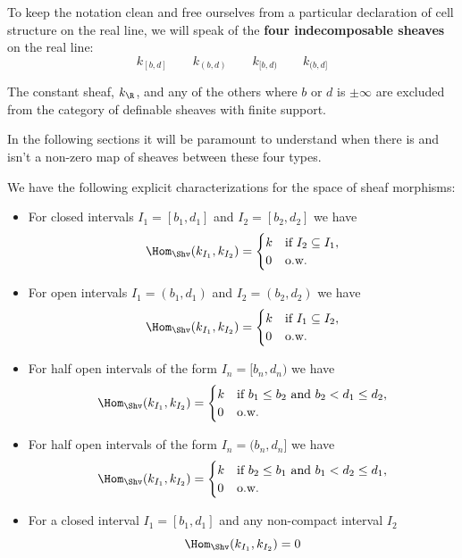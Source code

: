 To keep the notation clean and free ourselves from a particular declaration of cell structure on the real line, we will speak of the \textbf{four indecomposable sheaves} on the real line:
\[
k_{[b,d]} \qquad k_{(b,d)} \qquad k_{[b,d)} \qquad k_{(b,d]}
\]

\begin{rmk}
The constant sheaf, $k_{\R}$, and any of the others where $b$ or $d$ is $\pm\infty$ are excluded from the category of definable sheaves with finite support.
\end{rmk}

In the following sections it will be paramount to understand when there is and isn't a non-zero map of sheaves between these four types.

\begin{prop}\label{prop:devissage}
We have the following explicit characterizations for the space of sheaf morphisms:
\begin{itemize}
\item For closed intervals $I_1=[b_1,d_1]$ and $I_2=[b_2,d_2]$ we have
\begin{equation*}
 \Hom_{\Shv}(k_{I_1},k_{I_2})=
\begin{cases}
 k & \text{if } I_2\subseteq I_1, \\
0 & \text{o.w.}
\end{cases}
\end{equation*}
\item For open intervals $I_1=(b_1,d_1)$ and $I_2=(b_2,d_2)$ we have
\begin{equation*}
 \Hom_{\Shv}(k_{I_1},k_{I_2})=
\begin{cases}
 k & \text{if } I_1\subseteq I_2, \\
0 & \text{o.w.}
\end{cases}
\end{equation*}
\item For half open intervals of the form $I_n=[b_n,d_n)$ we have
\begin{equation*}
 \Hom_{\Shv}(k_{I_1},k_{I_2})=
\begin{cases}
 k & \text{if } b_1\leq b_2 \text{ and } b_2<d_1\leq d_2 , \\
0 & \text{o.w.}
\end{cases}
\end{equation*}
\item For half open intervals of the form $I_n=(b_n,d_n]$ we have
\begin{equation*}
 \Hom_{\Shv}(k_{I_1},k_{I_2})=
\begin{cases}
 k & \text{if } b_2\leq b_1 \text{ and } b_1<d_2\leq d_1, \\
0 & \text{o.w.}
\end{cases}
\end{equation*}
\item For a closed interval $I_1=[b_1,d_1]$ and any non-compact interval $I_2$
\begin{equation*}
 \Hom_{\Shv}(k_{I_1},k_{I_2})= 0
\end{equation*}
\end{itemize}
\end{prop}
